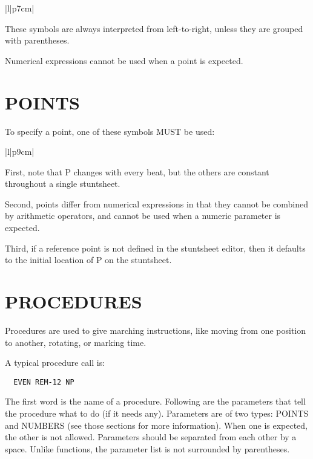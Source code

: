 \begin{tabular}{|l|p{7cm}|}\hline
{}
\end{tabular}

These symbols are always interpreted from left-to-right, unless they are
grouped with parentheses.

Numerical expressions cannot be used when a point is expected.

\section{POINTS}\label{points}

To specify a point, one of these symbols MUST be used:

\begin{tabular}{|l|p{9cm}|}\hline
{}\hline\hline
{}
\end{tabular}

First, note that P changes with every beat, but the others are constant
throughout a single stuntsheet.

Second, points differ from numerical expressions in that they cannot be
combined by arithmetic operators, and cannot be used when a numeric
parameter is expected.

Third, if a reference point is not defined in the stuntsheet editor, then
it defaults to the initial location of P on the stuntsheet.

\section{PROCEDURES}\label{procedures}

Procedures are used to give marching instructions, like moving from one
position to another, rotating, or marking time.

A typical procedure call is:
\begin{verbatim}
  EVEN REM-12 NP
\end{verbatim}
The first word is the name of a procedure.  Following are the parameters
that tell the procedure what to do (if it needs any).  Parameters are of
two types: POINTS and NUMBERS (see those sections for more information).
When one is expected, the other is not allowed.  Parameters should be
separated from each other by a space.  Unlike functions, the parameter list
is not surrounded by parentheses.

